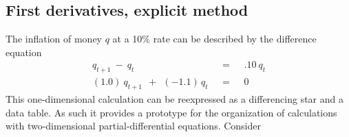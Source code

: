 \subsection{First derivatives, explicit method}
\par
The inflation of money  $q$  at a 10\% rate can be described by the difference 
equation
\begin{eqnarray}
q_{ t+1 }\ -\ q_t\ \ \ &=&\ \ \ .10 \  q_t
\label{eqn:two1a}
\\
( 1.0 )\ q_{ t+1 }\ \ +\ \  ( -1.1 )\, q_t\ \ \ &=&\ \ \ 0
\label{eqn:two1b}
\end{eqnarray}
This one-dimensional calculation can be reexpressed as
a differencing star and a data table.
As such it provides a prototype for the organization of calculations 
with two-dimensional partial-differential equations.
Consider
